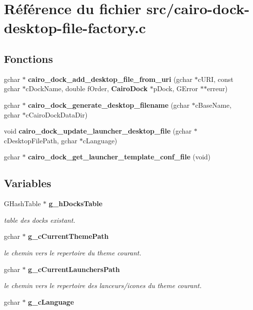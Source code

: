 \section{R\'{e}f\'{e}rence du fichier src/cairo-dock-desktop-file-factory.c}
\label{cairo-dock-desktop-file-factory_8c}
\subsection*{Fonctions}
\begin{CompactItemize}
\item 
gchar $\ast$ {\bf cairo\_\-dock\_\-add\_\-desktop\_\-file\_\-from\_\-uri} (gchar $\ast$c\-URI, const gchar $\ast$c\-Dock\-Name, double f\-Order, {\bf Cairo\-Dock} $\ast$p\-Dock, GError $\ast$$\ast$erreur)
\item 
gchar $\ast$ {\bf cairo\_\-dock\_\-generate\_\-desktop\_\-filename} (gchar $\ast$c\-Base\-Name, gchar $\ast$c\-Cairo\-Dock\-Data\-Dir)
\item 
void {\bf cairo\_\-dock\_\-update\_\-launcher\_\-desktop\_\-file} (gchar $\ast$c\-Desktop\-File\-Path, gchar $\ast$c\-Language)
\item 
gchar $\ast$ {\bf cairo\_\-dock\_\-get\_\-launcher\_\-template\_\-conf\_\-file} (void)
\end{CompactItemize}
\subsection*{Variables}
\begin{CompactItemize}
\item 
GHash\-Table $\ast$ {\bf g\_\-h\-Docks\-Table}
\begin{CompactList}\small\item\em table des docks existant. \item\end{CompactList}\item 
gchar $\ast$ {\bf g\_\-c\-Current\-Theme\-Path}
\begin{CompactList}\small\item\em le chemin vers le repertoire du theme courant. \item\end{CompactList}\item 
gchar $\ast$ {\bf g\_\-c\-Current\-Launchers\-Path}
\begin{CompactList}\small\item\em le chemin vers le repertoire des lanceurs/icones du theme courant. \item\end{CompactList}\item 
gchar $\ast$ {\bf g\_\-c\-Language}
\end{CompactItemize}


